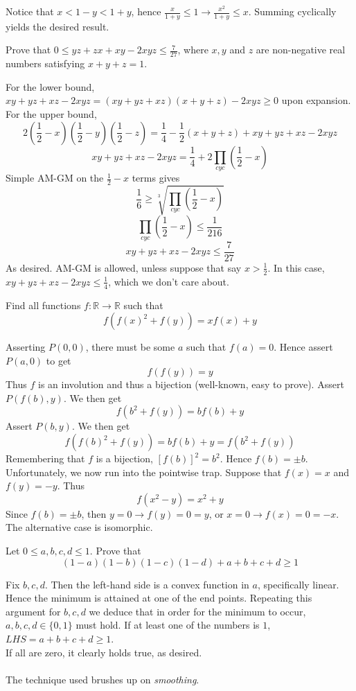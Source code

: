 \documentclass[11pt]{scrartcl}
\begin{document}
\begin{soln}
  Notice that $x<1-y<1+y$, hence $\frac{x}{1+y}\le 1\to \frac{x^2}{1+y}\le x$. Summing cyclically yields the desired result.
\end{soln}
\begin{example}
  [IMO 1984]
  Prove that $0\le yz+zx+xy-2xyz\le{\frac{7}{27}}$, where $x,y$ and $z$ are non-negative real numbers satisfying $x+y+z=1$.
\end{example}
\begin{soln}
  For the lower bound, $xy+yz+xz-2xyz=(xy+yz+xz)(x+y+z)-2xyz\ge 0$ upon expansion.
  For the upper bound,
  $$2\left(\frac{1}{2}-x\right)\left(\frac{1}{2}-y\right)\left(\frac{1}{2}-z\right)=\frac{1}{4}-\frac{1}{2}(x+y+z)+xy+yz+xz-2xyz$$
  $$xy+yz+xz-2xyz=\frac{1}{4}+2\prod_{cyc}\left(\frac{1}{2}-x\right)$$
  Simple AM-GM on the $\frac{1}{2}-x$ terms gives
  $$\frac{1}{6}\ge \sqrt[3]{\prod_{cyc}\left(\frac{1}{2}-x\right)}$$
  $$\prod_{cyc}\left(\frac{1}{2}-x\right)\le \frac{1}{216}$$
  $$xy+yz+xz-2xyz\le \frac{7}{27}$$
  As desired. AM-GM is allowed, unless suppose that say $x>\frac{1}{2}$.
  In this case, $xy+yz+xz-2xyz\le \frac{1}{4}$, which we don't care about.
\end{soln}
\begin{example}
  [Kyrgyzstan]
  Find all functions $f:\mathbb{R}\to \mathbb{R}$ such that
  $$f(f(x)^2+f(y))=xf(x)+y$$
\end{example}
\begin{soln}
  Asserting $P(0,0)$, there must be some $a$ such that $f(a)=0$.
  Hence assert $P(a,0)$ to get
  $$f(f(y))=y$$
  Thus $f$ is an involution and thus a bijection (well-known, easy to prove).
  Assert $P(f(b), y)$. We then get
  $$f(b^2+f(y))=bf(b)+y$$
  Assert $P(b,y)$. We then get
  $$f(f(b)^2+f(y))=bf(b)+y=f(b^2+f(y))$$
  Remembering that $f$ is a bijection, $[f(b)]^2=b^2$. Hence $f(b)=\pm b$.
  Unfortunately, we now run into the pointwise trap.
  Suppose that $f(x)=x$ and $f(y)=-y$. Thus
  $$f(x^2-y)=x^2+y$$
  Since $f(b)=\pm b$, then $y=0\to f(y)=0=y$, or $x=0\to f(x)=0=-x$.
  The alternative case is isomorphic.
\end{soln}
\begin{example}
  Let $0\le a,b,c,d\le 1$. Prove that
  $$(1-a)(1-b)(1-c)(1-d)+a+b+c+d\ge 1$$
\end{example}
\begin{soln}
  Fix $b,c,d$. Then the left-hand side is a convex function in $a$,
  specifically linear. Hence the minimum is attained at one of the end points.
  Repeating this argument for $b,c,d$ we deduce that in order for the minimum
  to occur, $a,b,c,d\in\{0,1\}$ must hold.
  If at least one of the numbers is $1$, $LHS=a+b+c+d\ge 1$. \\
  If all are zero, it clearly holds true, as desired. \\ \\
  The technique used brushes up on \textit{smoothing}.
\end{soln}
\end{document}
